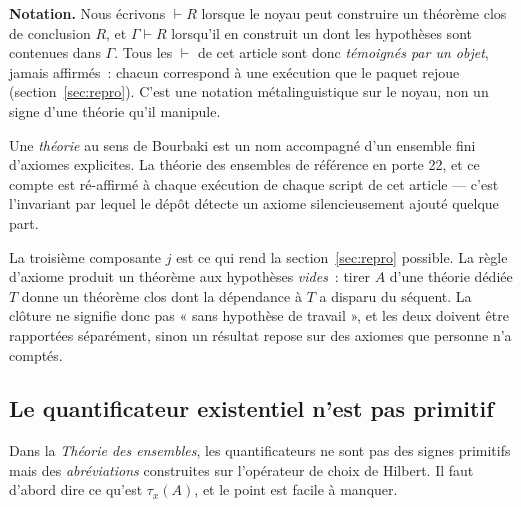 \documentclass[11pt]{article}
\theoremstyle{remark}\newtheorem{remarque}{Remarque}
\begin{document}
\noindent
\textbf{Notation.} Nous écrivons $\vdash R$ lorsque le noyau peut construire un théorème
clos de conclusion $R$, et $\Gamma \vdash R$ lorsqu'il en construit un dont les
hypothèses sont contenues dans $\Gamma$. Tous les $\vdash$ de cet article sont donc
\emph{témoignés par un objet}, jamais affirmés~: chacun correspond à une exécution que le
paquet rejoue (section~\ref{sec:repro}). C'est une notation métalinguistique sur le
noyau, non un signe d'une théorie qu'il manipule.

Une \emph{théorie} au sens de Bourbaki est un nom accompagné d'un ensemble fini d'axiomes
explicites. La théorie des ensembles de référence en porte 22, et ce compte est
ré-affirmé à chaque exécution de chaque script de cet article --- c'est l'invariant par
lequel le dépôt détecte un axiome silencieusement ajouté quelque part.

La troisième composante $j$ est ce qui rend la section~\ref{sec:repro} possible. La règle
d'axiome produit un théorème aux hypothèses \emph{vides}~: tirer $A$ d'une théorie dédiée
$T$ donne un théorème clos dont la dépendance à $T$ a disparu du séquent. La clôture ne
signifie donc pas « sans hypothèse de travail », et les deux doivent être rapportées
séparément, sinon un résultat repose sur des axiomes que personne n'a comptés.

\subsection{Le quantificateur existentiel n'est pas primitif}

Dans la \emph{Théorie des ensembles}, les quantificateurs ne sont pas des signes
primitifs mais des \emph{abréviations} construites sur l'opérateur de choix de Hilbert.
Il faut d'abord dire ce qu'est $\tau_x(A)$, et le point est facile à manquer.
\end{document}

